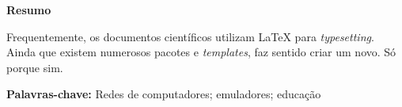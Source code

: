 
\cleardoublepage\thispagestyle{plain}

\begin{otherlanguage}{portuguese}
  \textbf{\Large Resumo}

  Frequentemente, os documentos científicos utilizam \LaTeX{} para
  \emph{typesetting}. Ainda que existem numerosos pacotes e
  \emph{templates}, faz sentido criar um novo. Só porque sim.

  \textbf{Palavras-chave:} Redes de computadores; emuladores; educação
\end{otherlanguage}
